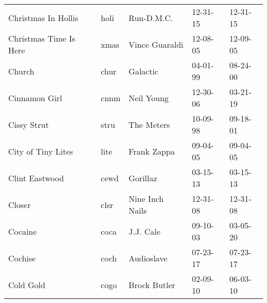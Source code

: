 \begin{longtable}{p{}p{}p{}p{}p{}}
                                                     Christmas In Hollis &          holi &                                               Run-D.M.C. &              12-31-15 &             12-31-15 \\
                                                  Christmas Time Is Here &          xmas &                                           Vince Guaraldi &              12-08-05 &             12-09-05 \\
                                                                  Church &          chur &                                                 Galactic &              04-01-99 &             08-24-00 \\
                                                           Cinnamon Girl &          cnnm &                                               Neil Young &              12-30-06 &             03-21-19 \\
                                                             Cissy Strut &          stru &                                               The Meters &              10-09-98 &             09-18-01 \\
                                                      City of Tiny Lites &          lite &                                              Frank Zappa &              09-04-05 &             09-04-05 \\
                                                          Clint Eastwood &          cewd &                                                 Gorillaz &              03-15-13 &             03-15-13 \\
                                                                  Closer &          clsr &                                          Nine Inch Nails &              12-31-08 &             12-31-08 \\
                                                                 Cocaine &          coca &                                                J.J. Cale &              09-10-03 &             03-05-20 \\
                                                                 Cochise &          coch &                                               Audioslave &              07-23-17 &             07-23-17 \\
                                                               Cold Gold &          cogo &                                             Brock Butler &              02-09-10 &             06-03-10 \\

\end{longtable}
